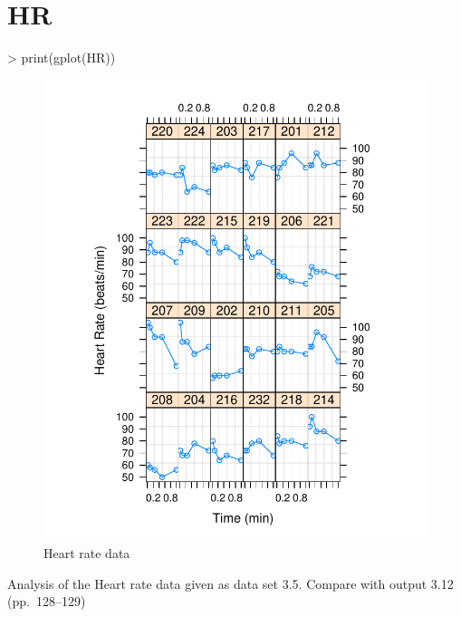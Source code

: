 \documentclass[12pt]{article}
\begin{document}
\section{HR}
\label{sec:HR}
\begin{Schunk}
\begin{Sinput}
> print(gplot(HR))
\end{Sinput}
\end{Schunk}
\begin{figure}[tbp]
  \centering
  \includegraphics{figs/f-hr1}
  \caption{Heart rate data}
  \label{fig:hr1}
\end{figure}
Analysis of the Heart rate data given as data set 3.5.  Compare with
output 3.12 (pp.~128--129)
\end{document}
